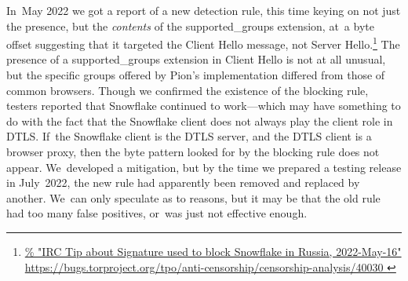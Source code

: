 \documentclass[letterpaper,twocolumn]{article}
\newlength{\urlfootnotesize}
\newcommand{\urlfootnote}[1]{\footnote{
\raggedright\hangindent\footnotemargin%
\fontsize{\urlfootnotesize}{\urlfootnotesize}\selectfont%
\url{#1}
}}
\begin{document}
In~May 2022 we got a report of a new detection rule,
this time keying on not just the presence, but the \emph{contents}
of the \mbox{supported\_groups} extension,
at~a byte offset suggesting that
it targeted the Client Hello message,
not Server Hello.\urlfootnote{
https://bugs.torproject.org/tpo/anti-censorship/censorship-analysis/40030
}
The presence of a \mbox{supported\_groups} extension in Client Hello is not at all unusual,
but the specific groups offered by Pion's implementation
differed from those of common browsers.
Though we confirmed the existence of the blocking rule,
testers reported that Snowflake continued to work---which
may have something to do with the fact that the Snowflake client
does not always play the client role in DTLS.
If~the Snowflake client is the DTLS server,
and the DTLS client is a browser proxy,
then the byte pattern looked for by the blocking rule does not appear.
We~developed a mitigation,
but by the time we prepared a testing release in July~2022,
the new rule
had apparently been removed
and replaced by another.
We~can only speculate as to reasons,
but it may be that the old rule
had too many false positives,
or~was just not effective enough.

\end{document}
